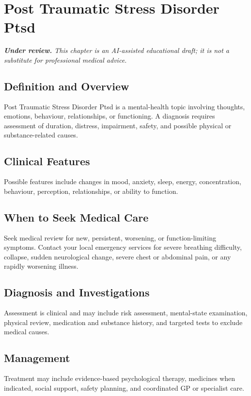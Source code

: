 \chapter{Post Traumatic Stress Disorder Ptsd}

\medskip
\noindent\textit{\textbf{Under review.} This chapter is an AI-assisted educational draft; it is not a substitute for professional medical advice.}

\section*{Definition and Overview}
Post Traumatic Stress Disorder Ptsd is a mental-health topic involving thoughts, emotions, behaviour, relationships, or functioning. A diagnosis requires assessment of duration, distress, impairment, safety, and possible physical or substance-related causes.

\section*{Clinical Features}
Possible features include changes in mood, anxiety, sleep, energy, concentration, behaviour, perception, relationships, or ability to function.

\section*{When to Seek Medical Care}
Seek medical review for new, persistent, worsening, or function-limiting symptoms. Contact your local emergency services for severe breathing difficulty, collapse, sudden neurological change, severe chest or abdominal pain, or any rapidly worsening illness.

\section*{Diagnosis and Investigations}
Assessment is clinical and may include risk assessment, mental-state examination, physical review, medication and substance history, and targeted tests to exclude medical causes.

\section*{Management}
Treatment may include evidence-based psychological therapy, medicines when indicated, social support, safety planning, and coordinated GP or specialist care.

